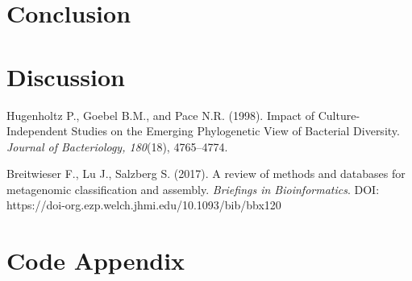\documentclass{article}
\begin{document}
\section{Conclusion}
\smallbreak

\section{Discussion}

\begin{thebibliography}{99}
Hugenholtz P., Goebel B.M., and Pace N.R. (1998). Impact of Culture-Independent Studies on the Emerging Phylogenetic View of Bacterial Diversity. \textit{Journal of Bacteriology, 180}(18), 4765–4774. 

Breitwieser F., Lu J., Salzberg S. (2017). A review of methods and databases for metagenomic classification and assembly. \textit{Briefings in Bioinformatics}. DOI: https://doi-org.ezp.welch.jhmi.edu/10.1093/bib/bbx120

\end{thebibliography}

\smallbreak
\appendix
\section{Code Appendix}
\end{document}
